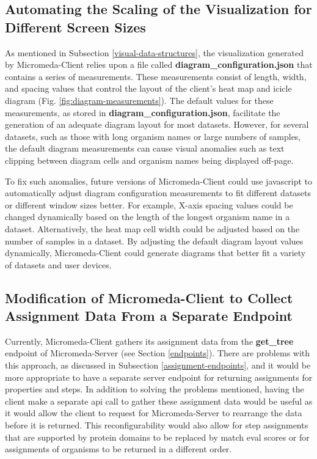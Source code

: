 \subsection{Automating the Scaling of the Visualization for Different Screen 
Sizes}

As mentioned in Subsection \ref{visual-data-structures}, the visualization 
generated by Micromeda-Client relies upon a file called 
\textbf{diagram\_configuration.json} that contains a series of measurements. 
These measurements consist of length, width, and spacing values that control the 
layout of the client's heat map and icicle diagram (Fig. 
\ref{fig:diagram-measurements}). The default values for these measurements, as 
stored in \textbf{diagram\_configuration.json}, facilitate the generation of an 
adequate diagram layout for most datasets. However, for several datasets, such 
as those with long organism names or large numbers of samples, the default 
diagram measurements can cause visual anomalies such as text clipping between 
diagram cells and organism names being displayed off-page.

To fix such anomalies, future versions of Micromeda-Client could use 
\gls{javascript} to automatically adjust diagram configuration measurements to 
fit different datasets or different window sizes better. For example, X-axis 
spacing values could be changed dynamically based on the length of the longest 
organism name in a dataset. Alternatively, the heat map cell width could be 
adjusted based on the number of samples in a dataset. By adjusting the default 
diagram layout values dynamically, Micromeda-Client could generate diagrams that 
better fit a variety of datasets and user devices.

\subsection{Modification of Micromeda-Client to Collect Assignment Data From a 
Separate Endpoint}

Currently, Micromeda-Client gathers its assignment data from the 
\textbf{get\_tree} endpoint of Micromeda-Server (see Section \ref{endpoints}). 
There are problems with this approach, as discussed in Subsection 
\ref{assignment-endpoints}, and it would be more appropriate to have a separate 
server endpoint for returning assignments for properties and steps. In addition 
to solving the problems mentioned, having the client make a separate \gls{api} 
call to gather these assignment data would be useful as it would allow the client 
to request for Micromeda-Server to rearrange the data before it is returned. 
This reconfigurability would also allow for step assignments that are supported 
by protein domains to be replaced by match \gls{eval} scores or for assignments 
of organisms to be returned in a different order.

